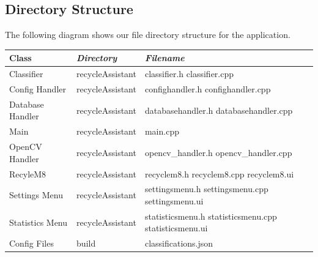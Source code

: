 \documentclass[conference]{IEEEtran}
\begin{document}
\subsection{Directory Structure}
The following diagram shows our file directory structure for the application.

\begin{table}[htbp!]\normalsize
\begin{center}
\begin{tabular}{|p{1.5cm}|p{2.2cm}|p{3.9cm}|}
\hline
\textbf{Class} & \textbf{\textit{Directory}}& \textbf{\textit{Filename}}\\
\hline
Classifier & recycleAssistant & classifier.h
\newline
classifier.cpp
\\ \hline
Config Handler & recycleAssistant & confighandler.h
\newline
confighandler.cpp
\newline
\\ \hline
Database Handler & recycleAssistant & databasehandler.h
\newline
databasehandler.cpp
\newline
\\ \hline
Main & recycleAssistant & main.cpp
\newline
\\ \hline
OpenCV Handler & recycleAssistant & opencv\_handler.h
\newline
opencv\_handler.cpp
\newline
\\ \hline
RecyleM8 & recycleAssistant & recyclem8.h
\newline
recyclem8.cpp
\newline
recyclem8.ui
\newline
\\ \hline
Settings Menu & recycleAssistant & settingsmenu.h
\newline
settingsmenu.cpp
\newline
settingsmenu.ui
\newline
\\ \hline
Statistics Menu & recycleAssistant & statisticsmenu.h
\newline
\newline
statisticsmenu.cpp
\newline
\newline
statisticsmenu.ui
\newline
\\ \hline
Config Files & build &
classifications.json
\newline

\end{tabular}
\end{center}
\end{table}
\end{document}

